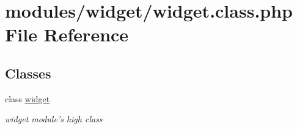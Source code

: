 \hypertarget{widget_8class_8php}{\section{modules/widget/widget.class.\-php File Reference}
\label{widget_8class_8php}
}
\subsection*{Classes}
\begin{DoxyCompactItemize}
\item 
class \hyperlink{classwidget}{widget}
\begin{DoxyCompactList}\small\item\em widget module's high class \end{DoxyCompactList}\end{DoxyCompactItemize}
